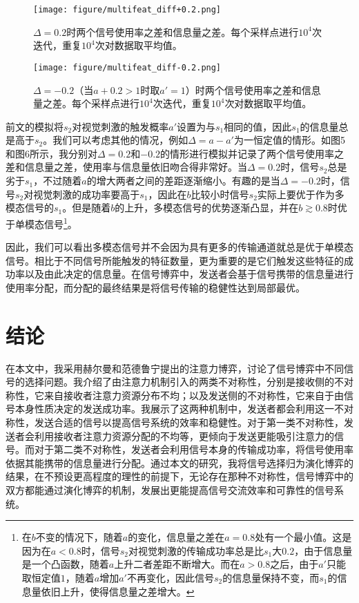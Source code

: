 \documentclass[12pt]{ctexart}  %
\begin{document}
\begin{figure}[htbp]
  \centering
  \begin{minipage}[t]{0.45\textwidth}
    \centering
    \texttt{[image: figure/multifeat\_diff+0.2.png]}
    \caption{$\Delta=0.2$时两个信号使用率之差和信息量之差。每个采样点进行$10^4$次迭代，重复$10^4$次对数据取平均值。}
    \label{fig:img1}
  \end{minipage}
  \hfill
  \begin{minipage}[t]{0.45\textwidth}
    \centering
    \texttt{[image: figure/multifeat\_diff-0.2.png]}
    \caption{$\Delta=-0.2$（当$a+0.2>1$时取$a'=1$）时两个信号使用率之差和信息量之差。每个采样点进行$10^4$次迭代，重复$10^4$次对数据取平均值。}
    \label{fig:img2}
  \end{minipage}
\end{figure}

前文的模拟将$s_2$对视觉刺激的触发概率$a'$设置为与$s_1$相同的值，因此$s_1$的信息量总是高于$s_2$。我们可以考虑其他的情况，例如$\Delta = a-a'$为一恒定值的情形。如图5和图6所示，我分别对$\Delta=0.2$和$-0.2$的情形进行模拟并记录了两个信号使用率之差和信息量之差，使用率与信息量依旧吻合得非常好。当$\Delta=0.2$时，信号$s_2$总是劣于$s_1$，不过随着$a$的增大两者之间的差距逐渐缩小。有趣的是当$\Delta=-0.2$时，信号$s_2$对视觉刺激的成功率要高于$s_1$，因此在$b$比较小时信号$s_2$实际上要优于作为多模态信号的$s_1$。但是随着$b$的上升，多模态信号的优势逐渐凸显，并在$b\gtrsim 0.8$时优于单模态信号\footnote{在$b$不变的情况下，随着$a$的变化，信息量之差在$a=0.8$处有一个最小值。这是因为在$a<0.8$时，信号$s_2$对视觉刺激的传输成功率总是比$s_1$大$0.2$，由于信息量是一个凸函数，随着$a$上升二者差距不断增大。而在$a>0.8$之后，由于$a'$只能取恒定值$1$，随着$a$增加$a'$不再变化，因此信号$s_2$的信息量保持不变，而$s_1$的信息量依旧上升，使得信息量之差增大。}。

因此，我们可以看出多模态信号并不会因为具有更多的传输通道就总是优于单模态信号。相比于不同信号所能触发的特征数量，更为重要的是它们触发这些特征的成功率以及由此决定的信息量。在信号博弈中，发送者会基于信号携带的信息量进行使用率分配，而分配的最终结果是将信号传输的稳健性达到局部最优。

\section*{结论}
在本文中，我采用赫尔曼和范德鲁宁提出的注意力博弈，讨论了信号博弈中不同信号的选择问题。我介绍了由注意力机制引入的两类不对称性，分别是接收侧的不对称性，它来自接收者注意力资源分布不均；以及发送侧的不对称性，它来自于由信号本身性质决定的发送成功率。我展示了这两种机制中，发送者都会利用这一不对称性，发送合适的信号以提高信号系统的效率和稳健性。对于第一类不对称性，发送者会利用接收者注意力资源分配的不均等，更倾向于发送更能吸引注意力的信号。而对于第二类不对称性，发送者会利用信号本身的传输成功率，将信号使用率依据其能携带的信息量进行分配。通过本文的研究，我将信号选择归为演化博弈的结果，在不预设更高程度的理性的前提下，无论存在那种不对称性，信号博弈中的双方都能通过演化博弈的机制，发展出更能提高信号交流效率和可靠性的信号系统。
\end{document}
